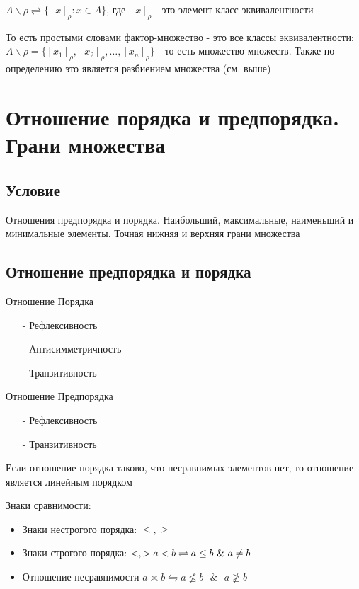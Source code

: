 \documentclass{report}
\newcommand{\band}{\mbox{ } \& \mbox{ }}
\begin{document}
$A\backslash\rho \rightleftharpoons \{[x]_{\rho}: x \in A\}$, где $[x]_{\rho}$ - это элемент класс эквивалентности

То есть простыми словами фактор-множество - это все классы эквивалентности:
$A\backslash\rho = \{[x_{1}]_{\rho}, [x_{2}]_{\rho}, \ldots, [x_{n}]_{\rho}\}$ - то есть множество множеств.
Также по определению это является разбиением множества (см. выше)
\newpage

\section{Отношение порядка и предпорядка. Грани множества}
\subsection{Условие}
Отношения предпорядка и порядка. Наибольший, максимальные, наименьший и
минимальные элементы. Точная нижняя и верхняя грани множества

\subsection{Отношение предпорядка и порядка}

Отношение Порядка
\begin{itemize}
    \item[-] Рефлексивность
    \item[-] Антисимметричность
    \item[-] Транзитивность
\end{itemize}
Отношение Предпорядка
\begin{itemize}
    \item[-] Рефлексивность
    \item[-] Транзитивность
\end{itemize}

Если отношение порядка таково, что несравнимых элементов нет, то отношение является линейным порядком

\medskip

Знаки сравнимости:
\begin{itemize}
    \item Знаки нестрогого порядка: $\leq, \geq$
    \item Знаки строгого порядка: $<, >\newline a < b \rightleftharpoons a \leq b \band a \neq b$
    \item Отношение несравнимости $a \asymp b \leftrightharpoons a \nleq b \band a \ngeq b$
\end{itemize}
\end{document}
